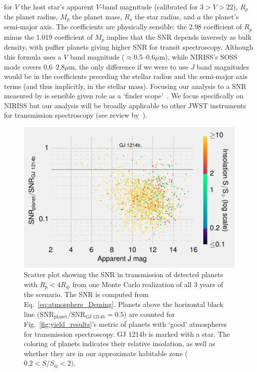 \begin{enumerate}
\begin{align*}
	\label{eq:atmosphere_Deming}
	\end{align*}
	for $V$ the host star's apparent $V$-band magnitude (calibrated for $3>V>22$), $R_p$ the planet radius, $M_p$ the planet mass, $R_\star$ the star radius, and $a$ the planet's semi-major axis.
	The coefficients are physically sensible: the 2.98 coefficient of $R_p$ minus the 1.019 coefficient of $M_p$ implies that the SNR depends inversely as bulk density, with puffier planets giving higher SNR for transit spectroscopy.
	Although this formula uses a $V$ band magnitude ($\approx$0.5--0.6$\mu$m), while NIRISS's SOSS mode covers 0.6--2.8$\mu$m, the only difference if we were to use $J$ band magnitudes would be in the coefficients preceding the stellar radius and the semi-major axis terms (and thus implicitly, in the stellar mass).
	Focusing our analysis to a SNR measured by \jwst is sensible given \tesss role as a `\jwst finder scope'~\citep{deming_jwst_tess_2009}.
	We focus specifically on NIRISS but our analysis will be broadly applicable 
	to other JWST instruments for transmission 
	spectroscopy (see review by~\citet{beichman_observations_2014}).
	\begin{figure}[!th]
		\centering
		\includegraphics[]{figures/SNR_in_transmission.pdf}
		\caption{ Scatter plot showing the SNR in transmission of detected planets with $R_p<4R_\oplus$ from one Monte Carlo realization of all 3 years of the \npole\:scenario.
			The SNR is computed from Eq.~\protect\ref{eq:atmosphere_Deming}.
			Planets above the horizontal black line ($\mathrm{SNR_{planet}/SNR_{GJ\ 1214b}} = 0.5$) are counted for Fig.~\protect\ref{fig:yield_results}'s metric of planets with `good' atmospheres for transmission spectroscopy.
			GJ 1214b is marked with a star.
			The coloring of planets indicates their relative insolation, as well as 
			whether they are in our approximate habitable zone ($0.2<S/S_\oplus<2)$.
		}
		\label{fig:atmosphere_scatter}
	\end{figure}


\end{enumerate}
